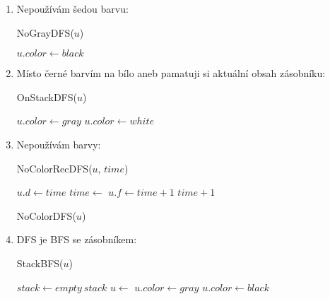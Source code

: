 \documentclass[12pt,a4paper]{extarticle}
\begin{document}
\begin{enumerate}
	\item Nepoužívám šedou barvu:

	\begin{procedure}[H]
		\caption{NoGrayDFS($u$)}
		\BlankLine
		 {
			 {
				 \;
			}
		}
		$\mathit{u.color} \leftarrow \mathit{black}$ \;
	\end{procedure}

	\item Místo černé barvím na bílo aneb pamatuji si aktuální obsah zásobníku:
	
	\begin{procedure}[H]
		\caption{OnStackDFS($u$)}
		\BlankLine
		$\mathit{u.color} \leftarrow \mathit{gray}$ \;
		 {
			 {
				 \;
			}
		}
		$\mathit{u.color} \leftarrow \mathit{white}$ \;
	\end{procedure}

	\item Nepoužívám barvy:


	\begin{procedure}[H]
		\caption{NoColorRecDFS($u$, $time$)}
		\BlankLine{}
		$u.d \leftarrow time$ \;
		 {
			 {
				$time \leftarrow $  \;
			}
		}
		$u.f \leftarrow time+1$ \;
		\Return $time+1$\;
	\end{procedure}
	\begin{procedure}[H]
		\caption{NoColorDFS($u$)}
		\BlankLine{}
		 \;
	\end{procedure}

	\item DFS je BFS se zásobníkem:
	
	\begin{procedure}[H]
		\caption{StackBFS($u$)}
		\BlankLine
		$\mathit{stack} \leftarrow \mathit{empty~stack}$ \;
		 \;
		 {
			$u \leftarrow $  \;
			$\mathit{u.color} \leftarrow \mathit{gray}$ \;
			 {
				 {
					 \;
				}
			}
			$\mathit{u.color} \leftarrow \mathit{black}$ \;
		}
	\end{procedure}

\end{enumerate}
\end{document}
